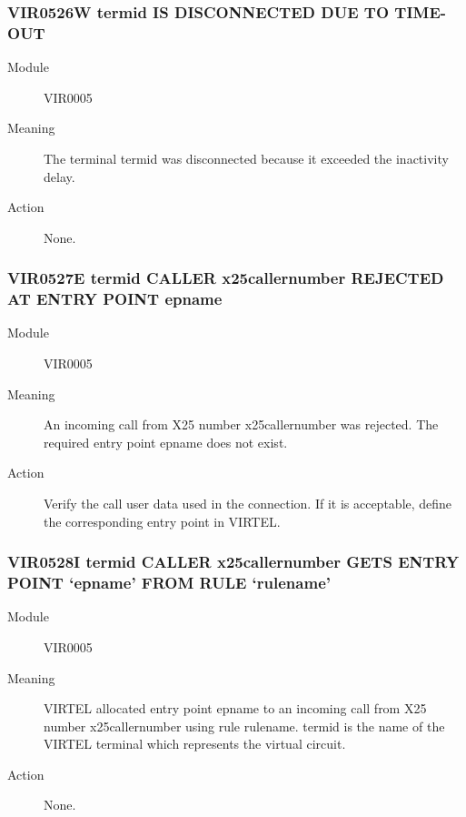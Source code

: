 \documentclass[letterpaper,10pt,english]{sphinxmanual}
\begin{document}
\subsubsection{VIR0526W termid IS DISCONNECTED DUE TO TIME-OUT}
\label{\detokenize{messages:vir0526w-termid-is-disconnected-due-to-time-out}}\begin{description}
\item[{Module}] \leavevmode
VIR0005

\item[{Meaning}] \leavevmode
The terminal termid was disconnected because it exceeded the inactivity delay.

\item[{Action}] \leavevmode
None.

\end{description}


\subsubsection{VIR0527E termid CALLER x25callernumber REJECTED AT ENTRY POINT epname}
\label{\detokenize{messages:vir0527e-termid-caller-x25callernumber-rejected-at-entry-point-epname}}\begin{description}
\item[{Module}] \leavevmode
VIR0005

\item[{Meaning}] \leavevmode
An incoming call from X25 number x25callernumber was rejected. The required entry point epname does not exist.

\item[{Action}] \leavevmode
Verify the call user data used in the connection. If it is acceptable, define the corresponding entry point in VIRTEL.

\end{description}


\subsubsection{VIR0528I termid CALLER x25callernumber GETS ENTRY POINT ‘epname’ FROM RULE ‘rulename’}
\label{\detokenize{messages:vir0528i-termid-caller-x25callernumber-gets-entry-point-epname-from-rule-rulename}}\begin{description}
\item[{Module}] \leavevmode
VIR0005

\item[{Meaning}] \leavevmode
VIRTEL allocated entry point epname to an incoming call from X25 number x25callernumber using rule rulename. termid is the name of the VIRTEL terminal which represents the virtual circuit.

\item[{Action}] \leavevmode
None.

\end{description}
\end{document}
